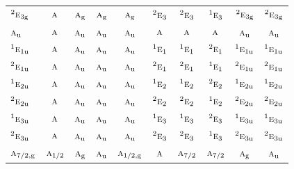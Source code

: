 \documentclass[10pt,a4paper]{article}
\numberwithin{equation}{section}
\newcommand{\irr}[1]{\text{\normalfont\scshape #1}}
\newcommand{\conjpair}[1]{{}^{#1}}
\newcommand{\ptag}[1]{\mathrm{#1}}
\begin{document}
{\begin{longtable}{@{}lccccccccc@{}}
$\conjpair{2}\irr{e}_{3\ptag{g}}$ & $\irr{a}$ & $\irr{a}_{\ptag{g}}$ & $\irr{a}_{\ptag{g}}$ & $\irr{a}_{\ptag{g}}$ & $\conjpair{2}\irr{e}_{3}$ & $\conjpair{2}\irr{e}_{3}$ & $\conjpair{1}\irr{e}_{3}$ & $\conjpair{2}\irr{e}_{3\ptag{g}}$ & $\conjpair{2}\irr{e}_{3\ptag{g}}$\\
$\irr{a}_{\ptag{u}}$ & $\irr{a}$ & $\irr{a}_{\ptag{u}}$ & $\irr{a}_{\ptag{u}}$ & $\irr{a}_{\ptag{u}}$ & $\irr{a}$ & $\irr{a}$ & $\irr{a}$ & $\irr{a}_{\ptag{u}}$ & $\irr{a}_{\ptag{u}}$\\
$\conjpair{1}\irr{e}_{1\ptag{u}}$ & $\irr{a}$ & $\irr{a}_{\ptag{u}}$ & $\irr{a}_{\ptag{u}}$ & $\irr{a}_{\ptag{u}}$ & $\conjpair{1}\irr{e}_{1}$ & $\conjpair{1}\irr{e}_{1}$ & $\conjpair{2}\irr{e}_{1}$ & $\conjpair{1}\irr{e}_{1\ptag{u}}$ & $\conjpair{1}\irr{e}_{1\ptag{u}}$\\
$\conjpair{2}\irr{e}_{1\ptag{u}}$ & $\irr{a}$ & $\irr{a}_{\ptag{u}}$ & $\irr{a}_{\ptag{u}}$ & $\irr{a}_{\ptag{u}}$ & $\conjpair{2}\irr{e}_{1}$ & $\conjpair{2}\irr{e}_{1}$ & $\conjpair{1}\irr{e}_{1}$ & $\conjpair{2}\irr{e}_{1\ptag{u}}$ & $\conjpair{2}\irr{e}_{1\ptag{u}}$\\
$\conjpair{1}\irr{e}_{2\ptag{u}}$ & $\irr{a}$ & $\irr{a}_{\ptag{u}}$ & $\irr{a}_{\ptag{u}}$ & $\irr{a}_{\ptag{u}}$ & $\conjpair{1}\irr{e}_{2}$ & $\conjpair{1}\irr{e}_{2}$ & $\conjpair{2}\irr{e}_{2}$ & $\conjpair{1}\irr{e}_{2\ptag{u}}$ & $\conjpair{1}\irr{e}_{2\ptag{u}}$\\
$\conjpair{2}\irr{e}_{2\ptag{u}}$ & $\irr{a}$ & $\irr{a}_{\ptag{u}}$ & $\irr{a}_{\ptag{u}}$ & $\irr{a}_{\ptag{u}}$ & $\conjpair{2}\irr{e}_{2}$ & $\conjpair{2}\irr{e}_{2}$ & $\conjpair{1}\irr{e}_{2}$ & $\conjpair{2}\irr{e}_{2\ptag{u}}$ & $\conjpair{2}\irr{e}_{2\ptag{u}}$\\
$\conjpair{1}\irr{e}_{3\ptag{u}}$ & $\irr{a}$ & $\irr{a}_{\ptag{u}}$ & $\irr{a}_{\ptag{u}}$ & $\irr{a}_{\ptag{u}}$ & $\conjpair{1}\irr{e}_{3}$ & $\conjpair{1}\irr{e}_{3}$ & $\conjpair{2}\irr{e}_{3}$ & $\conjpair{1}\irr{e}_{3\ptag{u}}$ & $\conjpair{1}\irr{e}_{3\ptag{u}}$\\
$\conjpair{2}\irr{e}_{3\ptag{u}}$ & $\irr{a}$ & $\irr{a}_{\ptag{u}}$ & $\irr{a}_{\ptag{u}}$ & $\irr{a}_{\ptag{u}}$ & $\conjpair{2}\irr{e}_{3}$ & $\conjpair{2}\irr{e}_{3}$ & $\conjpair{1}\irr{e}_{3}$ & $\conjpair{2}\irr{e}_{3\ptag{u}}$ & $\conjpair{2}\irr{e}_{3\ptag{u}}$\\
$\irr{a}_{7/2,\ptag{g}}$ & $\irr{a}_{1/2}$ & $\irr{a}_{\ptag{g}}$ & $\irr{a}_{\ptag{u}}$ & $\irr{a}_{1/2,\ptag{g}}$ & $\irr{a}$ & $\irr{a}_{7/2}$ & $\irr{a}_{7/2}$ & $\irr{a}_{\ptag{g}}$ & $\irr{a}_{\ptag{u}}$\\

\end{longtable}}
\end{document}
